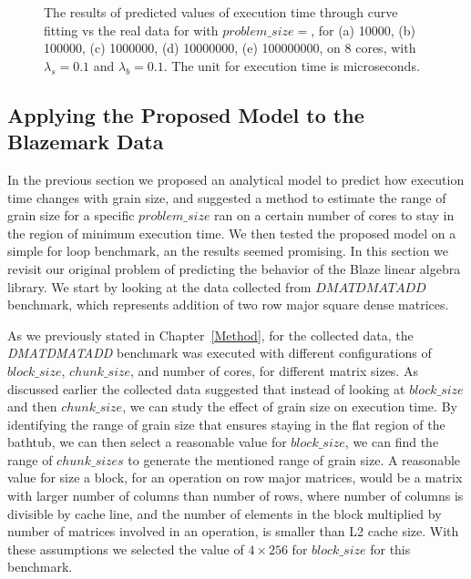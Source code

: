 \begin{figure}[H]
{		\label{fig51:d}}\hfill
	\caption{The results of predicted values of execution time through curve fitting vs the real data for with $problem\_size=$, for (a) 10000, (b) 100000, (c) 1000000, (d) 10000000, (e) 100000000, on 8 cores, with $\lambda_{s}=0.1$ and $\lambda_{b}=0.1$. The unit for execution time is microseconds.}
	\label{fig51}	
\end{figure}



\subsection{Applying the Proposed Model to the Blazemark Data}
In the previous section we proposed an analytical model to predict how execution time changes with grain size, and suggested a method to estimate the range of grain size for a specific $problem\_{size}$ ran on a certain number of cores to stay in the region of minimum execution time. We then tested the proposed model on a simple for loop benchmark, an the results seemed promising.
In this section we revisit our original problem of predicting the behavior of the Blaze linear algebra library. 
We start by looking at the data collected from $DMATDMATADD$ benchmark, which represents addition of two row major square dense matrices.
  
As we previously stated in Chapter~\ref{Method}, for the collected data, the \emph{DMATDMATADD} benchmark was executed with different configurations of $block\_{size}$, $chunk\_{size}$, and number of cores, for different matrix sizes. 
As discussed earlier the collected data suggested that instead of looking at $block\_{size}$ and then $chunk\_{size}$, we can study the effect of grain size on execution time. By identifying the range of grain size that ensures staying in the flat region of the bathtub, we can then select a reasonable value for $block\_{size}$, we can find the range of $chunk\_{sizes}$ to generate the mentioned range of grain size. A reasonable value for size a block, for an operation on row major matrices, would be a matrix with larger number of columns than number of rows, where number of columns is divisible by cache line, and the number of elements in the block multiplied by number of matrices involved in an operation, is smaller than L2 cache size. With these assumptions we selected the value of $4\times{256}$ for $block\_{size}$ for this benchmark.

